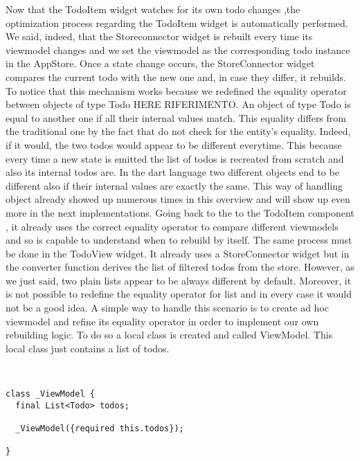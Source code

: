 Now that the TodoItem widget watches for its own todo changes ,the optimization process regarding the TodoItem widget is automatically performed. We said, indeed, that the Storeconnector widget is rebuilt every time its viewmodel changes and we set the viewmodel as the corresponding todo instance in the AppStore. Once a state change occurs, the StoreConnector widget compares the current todo with the new one and, in case they differ, it rebuilds. To notice that this mechanism works because we redefined the equality operator between objects of type Todo HERE RIFERIMENTO. An object of type Todo is equal to another one if all their internal values match. This equality differs from the traditional one by the fact that do not check for the entity’s equality. Indeed, if it would, the two todos would appear to be different everytime. This because every time a new state is emitted the list of todos is recreated from scratch and   also its internal todos are. In the dart language two different objects end to be different also if their internal values are exactly the same. This way of handling object already showed up numerous times in this overview and will show up even more in the next implementations. Going back to the to the TodoItem component , it already uses the correct equality operator to compare different viewmodels and so is capable to understand when to rebuild by itself. The same process must be done in the TodoView widget. It already uses a StoreConnector widget but in the converter function derives the list of filtered todos from the store. However, as we just said, two plain lists appear to be always different by default. Moreover, it is not possible to redefine the equality operator for list and in every case it would not be a good idea. A simple way to handle this scenario is to create ad hoc viewmodel and refine its equality operator in order to implement our own rebuilding logic. To do so a local class is created and called ViewModel. This local class just contains a list of todos.
\begin{code}
\mbox{}\\
 \mbox{}
		\label{code:2.14}
\begin{verbatim}
class _ViewModel {
  final List<Todo> todos;

  _ViewModel({required this.todos});

}
\end{verbatim}
\mbox{}
\end{code}

